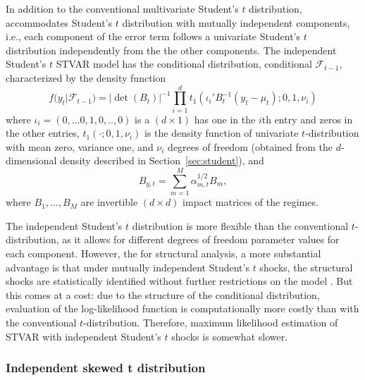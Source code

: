 \documentclass[nojss]{jss}
\begin{document}
In addition to the conventional multivariate Student's $t$ distribution,  accommodates Student's $t$ distribution with mutually independent components, i.e., each component of the error term follows a univariate Student's $t$ distribution independently from the the other components. The independent Student's $t$ STVAR model has the conditional distribution, conditional $\mathcal{F}_{t-1}$, characterized by the density function
\begin{equation}
f(y_t|\mathcal{F}_{t-1}) = |\det(B_t)|^{-1}\prod_{i=1}^d t_1(\iota_i'B_t^{-1}(y_t - \mu_t);0,1,\nu_i)
\end{equation}
where $\iota_i=(0,...0,1,0,..,0)$ is a $(d\times 1)$ has one in the $i$th entry and zeros in the other entries, $t_1(\cdot;0,1,\nu_i)$ is the density function of univariate $t$-distribution with mean zero, variance one, and $\nu_i$ degrees of freedom (obtained from the $d$-dimensional density described in Section~\ref{sec:student}), and
\begin{equation}\label{eq:Bt}
B_{y,t} = \sum_{m=1}^M \alpha_{m,t}^{1/2}B_m,
\end{equation}
where $B_1,...,B_M$ are invertible $(d\times d)$ impact matrices of the regimes.

The independent Student's $t$ distribution is more flexible than the conventional $t$-distribution, as it allows for different degrees of freedom parameter values for each component. However, the for structural analysis, a more substantial advantage is that under mutually independent Student's $t$ shocks, the structural shocks are statistically identified without further restrictions on the model \citep{Virolainen2:2024}. But this comes at a cost: due to the structure of the conditional distribution, evaluation of the log-likelihood function is computationally more costly than with the conventional $t$-distribution. Therefore, maximum likelihood estimation of STVAR with independent Student's $t$ shocks is somewhat slower.

\subsubsection{Independent skewed t distribution}\label{sec:ind_skewed_t}
\end{document}
